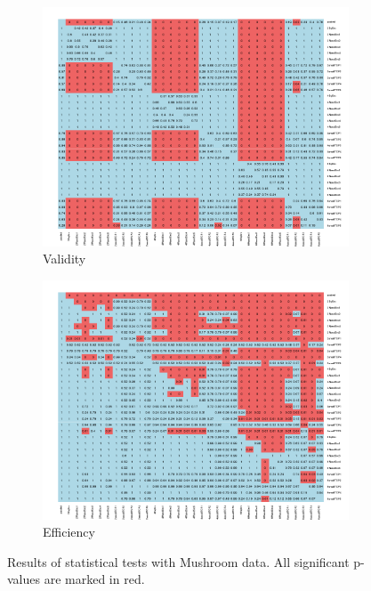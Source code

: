 \documentclass[main]{subfiles}
\begin{document}
\begin{figure}[!h]
\centering
\begin{subfigure}{.5\textwidth}
  \centering
  \includegraphics[width=\linewidth]{images/heatmapMush}
  \caption{Validity}
  \label{fig:valMush}
\end{subfigure}%
\begin{subfigure}{.5\textwidth}
  \centering
  \includegraphics[width=\linewidth]{images/heatmapMush_eff}
  \caption{Efficiency}
  \label{fig:effMush}
\end{subfigure}%
\caption{Results of statistical tests with Mushroom data. All significant p-values are marked in red.} \label{fig:testMush}
\end{figure}
\end{document}
